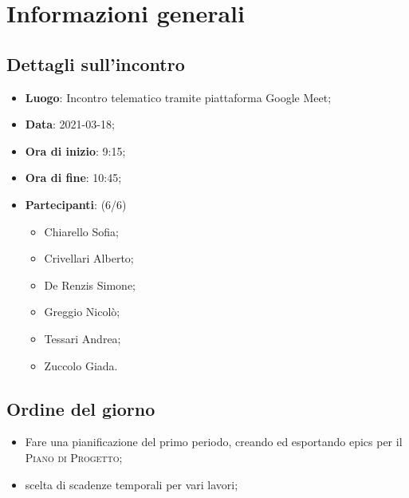 \section{Informazioni generali}

\subsection{Dettagli sull'incontro}
\begin{itemize}
\item \textbf{Luogo}: Incontro telematico tramite piattaforma Google Meet;
\item \textbf{Data}: 2021-03-18;
\item \textbf{Ora di inizio}: 9:15;
\item \textbf{Ora di fine}: 10:45;
\item \textbf{Partecipanti}: (6/6)
\begin{itemize}
	\item Chiarello Sofia;
	\item Crivellari Alberto;
	\item De Renzis Simone;
	\item Greggio Nicolò;
	\item Tessari Andrea;
	\item Zuccolo Giada.
\end{itemize}
\end{itemize}

\subsection{Ordine del giorno}
\begin{itemize}
	\item Fare una pianificazione del primo periodo, creando ed esportando epics per il \textsc{Piano di Progetto};
	\item scelta di scadenze temporali per vari lavori;

\end{itemize}


